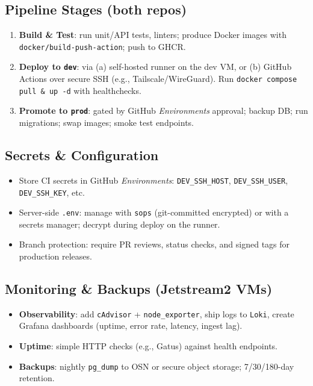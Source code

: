 \documentclass[11pt]{article}
\begin{document}
\subsection*{Pipeline Stages (both repos)}
\begin{enumerate}[leftmargin=1.2em]
  \item \textbf{Build \& Test}: run unit/API tests, linters; produce Docker images with \texttt{docker/build-push-action}; push to GHCR.
  \item \textbf{Deploy to \texttt{dev}}: via (a) self-hosted runner on the dev VM, or (b) GitHub Actions over secure SSH (e.g., Tailscale/WireGuard). Run \texttt{docker compose pull \& up -d} with healthchecks.
  \item \textbf{Promote to \texttt{prod}}: gated by GitHub \emph{Environments} approval; backup DB; run migrations; swap images; smoke test endpoints.
\end{enumerate}

\subsection*{Secrets \& Configuration}
\begin{itemize}[leftmargin=1.2em]
  \item Store CI secrets in GitHub \emph{Environments}: \texttt{DEV\_SSH\_HOST}, \texttt{DEV\_SSH\_USER}, \texttt{DEV\_SSH\_KEY}, etc.
  \item Server-side \texttt{.env}: manage with \texttt{sops} (git-committed encrypted) or with a secrets manager; decrypt during deploy on the runner.
  \item Branch protection: require PR reviews, status checks, and signed tags for production releases.
\end{itemize}

\subsection*{Monitoring \& Backups (Jetstream2 VMs)}
\begin{itemize}[leftmargin=1.2em]
  \item \textbf{Observability}: add \texttt{cAdvisor} + \texttt{node\_exporter}, ship logs to \texttt{Loki}, create Grafana dashboards (uptime, error rate, latency, ingest lag).
  \item \textbf{Uptime}: simple HTTP checks (e.g., Gatus) against health endpoints.
  \item \textbf{Backups}: nightly \texttt{pg\_dump} to OSN or secure object storage; 7/30/180-day retention.
\end{itemize}
\end{document}
